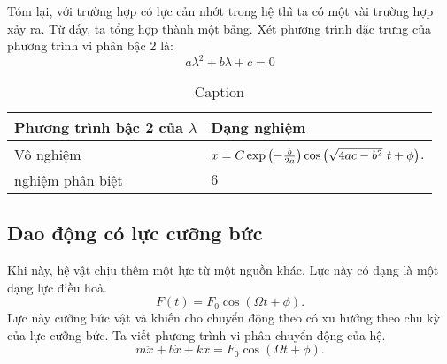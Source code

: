 \documentclass[12pt]{article}
\begin{document}
Tóm lại, với trường hợp có lực cản nhớt trong hệ thì ta có một vài trường hợp xảy ra. Từ đấy, ta tổng hợp thành một bảng. Xét phương trình đặc trưng của phương trình vi phân bậc 2 là:
\begin{equation*}
    a\lambda^2 + b\lambda + c = 0
\end{equation*}

\begin{table}[!htb]
    \centering
    \begin{tabular}{| >{\centering\arraybackslash}m{5cm} | >{\centering\arraybackslash}m{8cm} |}
    \hline
    Phương trình bậc 2 của \(\lambda\) & Dạng nghiệm \\
    \hline
    Vô nghiệm &\rule{0pt}{0.7cm} 
    \(x = C \exp{\left(- \frac{b}{2a} \displaystyle \right)} \cos{\left(\sqrt{4 ac - b^2} \ t + \phi \right)} \).
    \\
    \hline
    2 nghiệm phân biệt & \(6\)
    
    \end{tabular}
    \caption{Caption}
    \label{tab:my_label}
\end{table}

\subsection{Dao động có lực cưỡng bức}
Khi này, hệ vật chịu thêm một lực từ một nguồn khác. Lực này có dạng là một dạng lực điều hoà.
\begin{equation}
    F(t) = F_0 \cos{\left(\Omega t + \phi \right)}.
\end{equation}
Lực này cưỡng bức vật và khiến cho chuyển động theo có xu hướng theo chu kỳ của lực cưỡng bức. Ta viết phương trình vi phân chuyển động của hệ.
\begin{equation}
    m \ddot{x} + b \dot{x} + k x= F_0 \cos{\left(\Omega t + \phi \right)}.
\end{equation}
\end{document}
